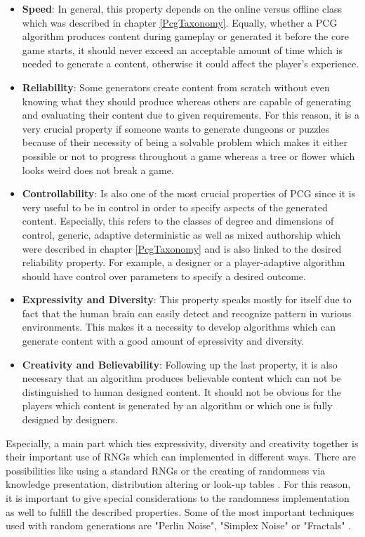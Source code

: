 \documentclass[MGS,Master,english]{twbook}%
\begin{document}
\begin{itemize}
	\item \textbf{Speed}: In general, this property depends on the online versus offline class which was described in chapter \ref{PcgTaxonomy}. Equally, whether a PCG algorithm produces content during gameplay or generated it before the core game starts, it should never exceed an acceptable amount of time which is needed to generate a content, otherwise it could affect the player's experience. \cite{pcg::book}
	\item \textbf{Reliability}: Some generators create content from scratch without even knowing what they should produce whereas others are capable of generating and evaluating their content due to given requirements. For this reason, it is a very crucial property if someone wants to generate dungeons or puzzles because of their necessity of being a solvable problem which makes it either possible or not to progress throughout a game whereas a tree or flower which looks weird does not break a game. \cite{pcg::book}
	\item \textbf{Controllability}: Is also one of the most crucial properties of PCG since it is very useful to be in control in order to specify aspects of the generated content. Especially, this refers to the classes of degree and dimensions of control, generic, adaptive deterministic as well as mixed authorship which were described in chapter \ref{PcgTaxonomy} and is also linked to the desired reliability property. For example, a designer or a player-adaptive algorithm should have control over parameters to specify a desired outcome. \cite{pcg::book}
	\item \textbf{Expressivity and Diversity}: This property speaks mostly for itself due to fact that the human brain can easily detect and recognize pattern in various environments. This makes it a necessity to develop algorithms which can generate content with a good amount of epressivity and diversity. \cite{pcg::book}
	\item \textbf{Creativity and Believability}: Following up the last property, it is also necessary that an algorithm produces believable content which can not be distinguished to human designed content. It should not be obvious for the players which content is generated by an algorithm or which one is fully designed by designers. \cite{pcg::book}
\end{itemize}
Especially, a main part which ties expressivity, diversity and creativity together is their important use of \ac{RNG}s which can implemented in different ways. There are possibilities like using a standard RNGs or the creating of randomness via knowledge presentation, distribution altering or look-up tables \cite{pcg::book}. For this reason, it is important to give special considerations to the randomness implementation as well to fulfill the described properties. Some of the most important techniques used with random generations are "Perlin Noise", "Simplex Noise" or "Fractals" \cite{pcg::shortHistoryOfDynamicAndPCG}.\\
\end{document}

